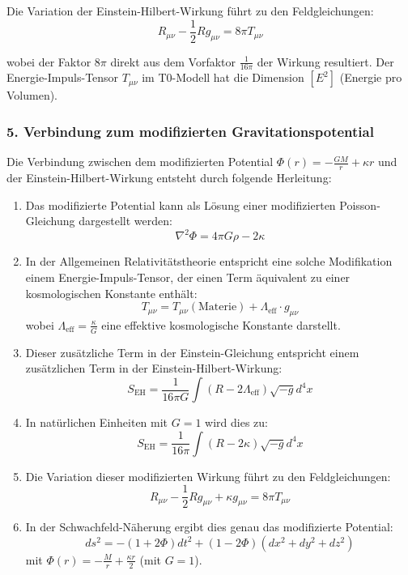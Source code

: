 \documentclass[12pt,a4paper]{article}
\begin{document}
Die Variation der Einstein-Hilbert-Wirkung führt zu den Feldgleichungen:
\[
R_{\mu\nu} - \frac{1}{2}Rg_{\mu\nu} = 8\pi T_{\mu\nu}
\]

wobei der Faktor $8\pi$ direkt aus dem Vorfaktor $\frac{1}{16\pi}$ der Wirkung resultiert. Der Energie-Impuls-Tensor $T_{\mu\nu}$ im T0-Modell hat die Dimension $[E^2]$ (Energie pro Volumen).

\subsubsection*{5. Verbindung zum modifizierten Gravitationspotential}

Die Verbindung zwischen dem modifizierten Potential $\Phi(r) = -\frac{GM}{r} + \kappa r$ und der Einstein-Hilbert-Wirkung entsteht durch folgende Herleitung:

\begin{enumerate}
	\item Das modifizierte Potential kann als Lösung einer modifizierten Poisson-Gleichung dargestellt werden:
	\[
	\nabla^2\Phi = 4\pi G\rho - 2\kappa
	\]
	
	\item In der Allgemeinen Relativitätstheorie entspricht eine solche Modifikation einem Energie-Impuls-Tensor, der einen Term äquivalent zu einer kosmologischen Konstante enthält:
	\[
	T_{\mu\nu} = T_{\mu\nu}(\text{Materie}) + \Lambda_{\text{eff}} \cdot g_{\mu\nu}
	\]
	wobei $\Lambda_{\text{eff}} = \frac{\kappa}{G}$ eine effektive kosmologische Konstante darstellt.
	
	\item Dieser zusätzliche Term in der Einstein-Gleichung entspricht einem zusätzlichen Term in der Einstein-Hilbert-Wirkung:
	\[
	S_{\mathrm{EH}} = \frac{1}{16\pi G}\int(R - 2\Lambda_{\text{eff}})\sqrt{-g}d^4x
	\]
	
	\item In natürlichen Einheiten mit $G = 1$ wird dies zu:
	\[
	S_{\mathrm{EH}} = \frac{1}{16\pi}\int(R - 2\kappa)\sqrt{-g}d^4x
	\]
	
	\item Die Variation dieser modifizierten Wirkung führt zu den Feldgleichungen:
	\[
	R_{\mu\nu} - \frac{1}{2}Rg_{\mu\nu} + \kappa g_{\mu\nu} = 8\pi T_{\mu\nu}
	\]
	
	\item In der Schwachfeld-Näherung ergibt dies genau das modifizierte Potential:
	\[
	ds^2 = -(1+2\Phi)dt^2 + (1-2\Phi)(dx^2 + dy^2 + dz^2)
	\]
	mit $\Phi(r) = -\frac{M}{r} + \frac{\kappa r}{2}$ (mit $G = 1$).
\end{enumerate}
\end{document}
